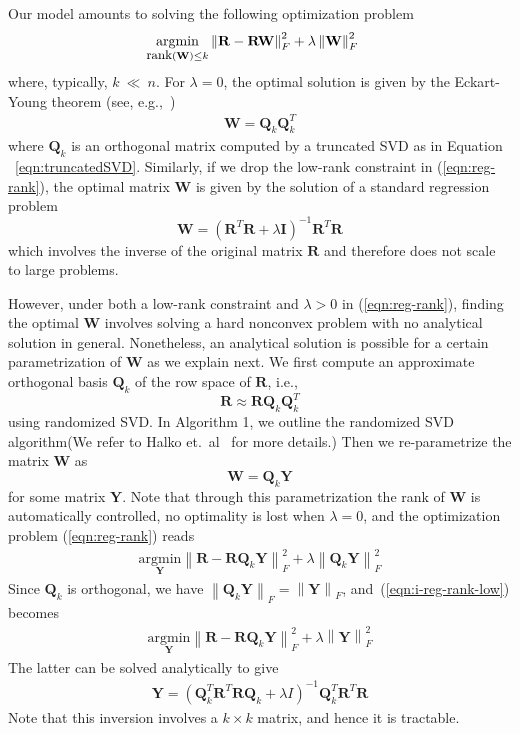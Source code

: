 \documentclass{article}
\newcommand{\citep}{\cite}
\newcommand{\R}{\mathbf{R}}
\newcommand{\I}{\mathbf{I}}
\newcommand{\Q}{\mathbf{Q}}
\newcommand{\W}{\mathbf{W}}
\newcommand{\Y}{\mathbf{Y}}
\begin{document}
Our model amounts to solving the following optimization problem
 \begin{align}
\label{eqn:reg-rank}
\underset{\mbox{\footnotesize rank}(\W) \le k}{\mathrm{argmin}} & \left \| \R - \R\W\right \|_F^2 + \lambda \left \|  \W \right \|_F^2
\end{align}
where, typically, $k\ \ll \ n$.
For $\lambda = 0$, the optimal solution is given by the Eckart-Young theorem (see, e.g.,~\citep{halko2011})
   \begin{align}
   \label{eqn:SVDOptimal}
   \W = \Q_k \Q_k^ T
   \end{align}
where  $\Q_k$ is an orthogonal matrix computed by a truncated SVD as in Equation ~\ref{eqn:truncatedSVD}.
Similarly, if we drop the low-rank constraint in (\ref{eqn:reg-rank}), the optimal matrix $\W$ is given by the solution of a standard regression problem
\begin{equation}
\W = (\R^T \R + \lambda \I)^{-1} \R^T \R
\end{equation}
which involves the inverse of the original matrix $\R$ and therefore does not scale to large problems.

However, under both a low-rank constraint and $\lambda > 0$ in (\ref{eqn:reg-rank}), finding the optimal $\W$ involves solving a hard nonconvex problem with no analytical solution in general. Nonetheless, an analytical solution is possible for a certain parametrization of $\W$ as we explain next. We first compute an approximate orthogonal basis $\Q_k$ of the row space of $\R$, i.e.,
\begin{equation}
\R \approx \R \Q_k \Q_k^T
\end{equation}
using randomized SVD. In Algorithm 1, we outline the randomized SVD algorithm(We refer to Halko et.~al~\citep{halko2011} for more details.)
Then we re-parametrize the matrix $\W$ as
\begin{equation}
\W = \Q_k \Y
\end{equation}
for some matrix $\Y$. Note that through this parametrization the rank of $\W$ is automatically controlled, no optimality is lost when $\lambda=0$, and the optimization problem (\ref{eqn:reg-rank}) reads
\begin{align}
\label{eqn:i-reg-rank-low}
\underset{\Y} {\mathrm{argmin}}  \left \| \R - \R \Q_k \Y \right \|_F^2 + \lambda \left \|  \Q_k \Y \right \|_F^2
\end{align}
Since $\Q_k$ is orthogonal, we have $\left \| \Q_k \Y \right \|_F = \left \|\Y\right \|_F$, and~(\ref{eqn:i-reg-rank-low}) becomes
\begin{align}
\underset{\Y}{\mathrm{argmin}} \left \| \R - \R\Q_k\Y\right \|_F^2 + \lambda \left \|  \Y \right \|_F^2
\end{align}
The latter can be solved analytically to give
\begin{align*}
\Y = (\Q_k^T \R^T\R\Q_k +\lambda I)^{-1} \Q_k^T \R^T \R
\end{align*}
Note that this inversion involves a $k \times k$ matrix, and hence it is tractable.
\end{document}
